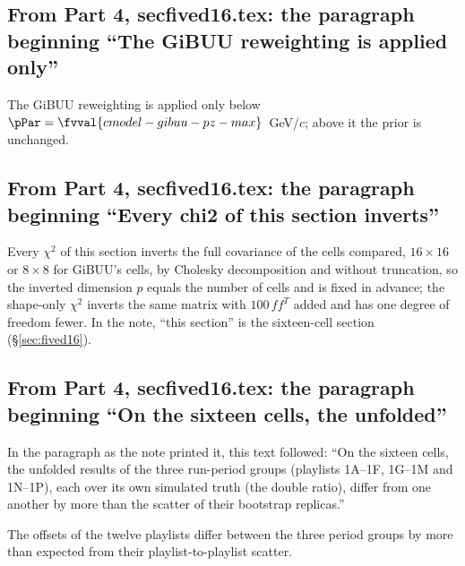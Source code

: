 \subsection{From Part 4, secfived16.tex: the paragraph beginning ``The GiBUU reweighting is applied only''}
The GiBUU reweighting is applied only below $\pPar=\fvval{cmodel-gibuu-pz-max}$~GeV/$c$; above it the prior is unchanged.

\subsection{From Part 4, secfived16.tex: the paragraph beginning ``Every chi2 of this section inverts''}
Every $\chi^2$ of this section inverts the full covariance of the cells compared, $16\times16$ or $8\times8$ for GiBUU's cells, by Cholesky decomposition and without truncation, so the inverted dimension $p$ equals the number of cells and is fixed in advance; the shape-only $\chi^2$ inverts the same matrix with $100\,f f^{T}$ added and has one degree of freedom fewer.
In the note, ``this section'' is the sixteen-cell section (\S\ref{sec:fived16}).\par

\subsection{From Part 4, secfived16.tex: the paragraph beginning ``On the sixteen cells, the unfolded''}
In the paragraph as the note printed it, this text followed: ``On the sixteen cells, the unfolded results of the three run-period groups (playlists 1A--1F, 1G--1M and 1N--1P), each over its own simulated truth (the double ratio), differ from one another by more than the scatter of their bootstrap replicas.''\par
The offsets of the twelve playlists differ between the three period groups by more than expected from their playlist-to-playlist scatter.

